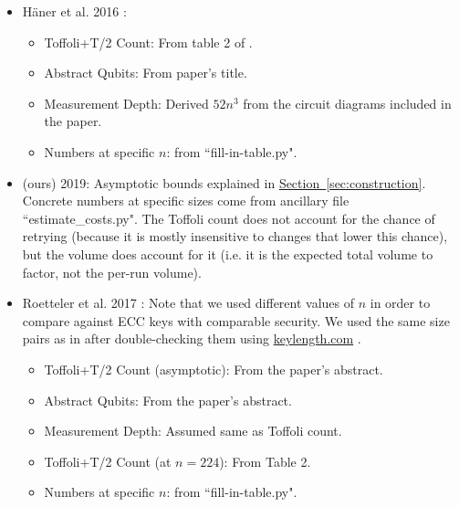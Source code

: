 \documentclass[superscriptaddress,notitlepage,longbibliography]{revtex4-1}
\theoremstyle{definition}
\theoremstyle{definition}
\renewcommand{\sec}[1]{\hyperref[sec:#1]{Section~\ref*{sec:#1}}}
\begin{document}
\begin{itemize}
\begin{itemize}
    \end{itemize}
    \item H\"{a}ner et al. 2016 \cite{haner2016factoring}:
    \begin{itemize}
        \item Toffoli+T/2 Count:
            From table 2 of \cite{roetteler2017quantum}.
        \item Abstract Qubits:
            From paper's title.
        \item Measurement Depth:
            Derived $52n^3$ from the circuit diagrams included in the paper.
        \item Numbers at specific $n$: from ``fill-in-table.py".
    \end{itemize}
    \item (ours) 2019:
        Asymptotic bounds explained in \sec{construction}.
        Concrete numbers at specific sizes come from ancillary file ``estimate\_costs.py".
        The Toffoli count does not account for the chance of retrying (because it is mostly insensitive to changes that lower this chance), but the volume does account for it (i.e. it is the expected total volume to factor, not the per-run volume).
    \item Roetteler et al. 2017 \cite{roetteler2017quantum}:
        Note that we used different values of $n$ in order to compare against ECC keys with comparable security.
        We used the same size pairs as in \cite{roetteler2017quantum} after double-checking them using \href{https://www.keylength.com/}{keylength.com} \cite{keylength2019}.
        \begin{itemize}
            \item Toffoli+T/2 Count (asymptotic):
                From the paper's abstract.
            \item Abstract Qubits:
                From the paper's abstract.
            \item Measurement Depth:
                Assumed same as Toffoli count.
            \item Toffoli+T/2 Count (at $n=224$):
                From Table 2.
            \item Numbers at specific $n$: from ``fill-in-table.py".
        \end{itemize}
\end{itemize}
\end{document}
